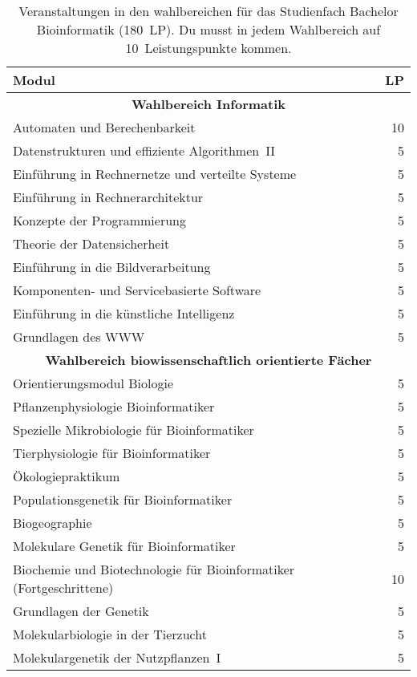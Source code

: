 \begin{table}[!th]
    \begin{small}
    \begin{tabularx}{\textwidth}{|X||r|}
        \hline
        \textbf{Modul}&\textbf{LP}\\\hline\hline
        \multicolumn{2}{|c|}{\textbf{Wahlbereich Informatik}}\\\hline
        Automaten und Berechenbarkeit&10\\\hline
        Datenstrukturen und effiziente Algorithmen~II&5\\\hline
        Einführung in Rechnernetze und verteilte Systeme&5\\\hline
        Einführung in Rechnerarchitektur&5\\\hline
        Konzepte der Programmierung&5\\\hline
        Theorie der Datensicherheit&5\\\hline
        Einführung in die Bildverarbeitung&5\\\hline
        Komponenten- und Servicebasierte Software&5\\\hline
        Einführung in die künstliche Intelligenz&5\\\hline
        Grundlagen des WWW&5\\\hline\hline
        \multicolumn{2}{|c|}{\textbf{Wahlbereich biowissenschaftlich orientierte Fächer}}\\\hline
        Orientierungsmodul Biologie&5\\\hline
        Pflanzenphysiologie Bioinformatiker&5\\\hline
        Spezielle Mikrobiologie für Bioinformatiker&5\\\hline
        Tierphysiologie für Bioinformatiker&5\\\hline
        Ökologiepraktikum&5\\\hline
        Populationsgenetik für Bioinformatiker&5\\\hline
        Biogeographie&5\\\hline
        Molekulare Genetik für Bioinformatiker&5\\\hline
        Biochemie und Biotechnologie für Bioinformatiker (Fortgeschrittene)&10\\\hline
        Grundlagen der Genetik&5\\\hline
        Molekularbiologie in der Tierzucht&5\\\hline
        Molekulargenetik der Nutzpflanzen~I&5\\\hline
    \end{tabularx}
    \end{small}
    \caption{Veranstaltungen in den wahlbereichen für das Studienfach Bachelor Bioinformatik (180~LP). Du musst in jedem Wahlbereich auf 10~Leistungspunkte kommen.\label{plan-bioinfo2}}
\end{table}

